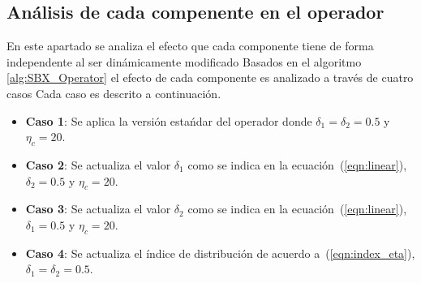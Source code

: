 \subsection{Análisis de cada compenente en el operador \SBX{}}

En este apartado se analiza el efecto que cada componente tiene de forma independente al ser dinámicamente modificado
%
%
Basados en el algoritmo \ref{alg:SBX_Operator} el efecto de cada componente es analizado a través de cuatro casos
%
Cada caso es descrito a continuación.

\begin{itemize}
\item \textbf{Caso 1}: Se aplica la versión estańdar del operador \SBX{} donde $\delta_1 = \delta_2 = 0.5$ y $\eta_c = 20$.
\item \textbf{Caso 2}: Se actualiza el valor $\delta_1$ como se indica en la ecuación~(\ref{eqn:linear}),  $\delta_2=0.5$ y $\eta_c = 20$.
\item \textbf{Caso 3}: Se actualiza el valor $\delta_2$ como se indica en la ecuación~(\ref{eqn:linear}), $\delta_1=0.5$ y $\eta_c = 20$.
\item \textbf{Caso 4}: Se actualiza el índice de distribución de acuerdo a~(\ref{eqn:index_eta}), $\delta_1=\delta_2=0.5$.
\end{itemize}

